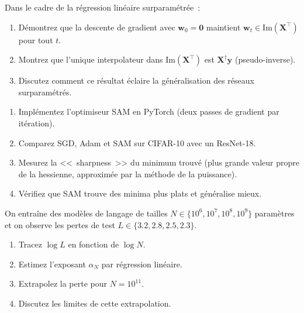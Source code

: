 \begin{exercice}
\label{exo:implicit-bias}
Dans le cadre de la r\'egression lin\'eaire surparam\'etr\'ee~:
\begin{enumerate}
    \item D\'emontrez que la descente de gradient avec $\mathbf{w}_0 = \mathbf{0}$
          maintient $\mathbf{w}_t \in \text{Im}(\mathbf{X}^\top)$ pour tout $t$.
    \item Montrez que l'unique interpolateur dans $\text{Im}(\mathbf{X}^\top)$
          est $\mathbf{X}^\dagger \mathbf{y}$ (pseudo-inverse).
    \item Discutez comment ce r\'esultat \'eclaire la g\'en\'eralisation
          des r\'eseaux surparam\'etr\'es.
\end{enumerate}
\end{exercice}

\begin{exercice}
\label{exo:sam}
\begin{enumerate}
    \item Impl\'ementez l'optimiseur SAM en PyTorch (deux passes de gradient
          par it\'eration).
    \item Comparez SGD, Adam et SAM sur CIFAR-10 avec un ResNet-18.
    \item Mesurez la <<~sharpness~>> du minimum trouv\'e (plus grande valeur
          propre de la hessienne, approxim\'ee par la m\'ethode de la puissance).
    \item V\'erifiez que SAM trouve des minima plus plats et g\'en\'eralise mieux.
\end{enumerate}
\end{exercice}

\begin{exercice}
\label{exo:scaling-laws}
On entra\^ine des mod\`eles de langage de tailles $N \in \{10^6, 10^7, 10^8, 10^9\}$
param\`etres et on observe les pertes de test $L \in \{3.2, 2.8, 2.5, 2.3\}$.
\begin{enumerate}
    \item Tracez $\log L$ en fonction de $\log N$.
    \item Estimez l'exposant $\alpha_N$ par r\'egression lin\'eaire.
    \item Extrapolez la perte pour $N = 10^{11}$.
    \item Discutez les limites de cette extrapolation.
\end{enumerate}
\end{exercice}
